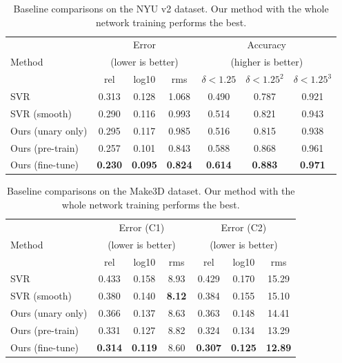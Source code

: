 \begin{table}
\center
\resizebox{1\linewidth}{!} {
\begin{tabular}{ | l |  c  c  c | c  c  c |}
\hline 
\multirow{3}{*}{{{Method}}} &\multicolumn{3}{c|}{Error} &\multicolumn{3}{c|}{Accuracy} \\
&\multicolumn{3}{c|}{(lower is better)} &\multicolumn{3}{c|}{(higher is better)} \\
\cline{2-7}
&rel &log10 &rms &$\delta < 1.25$ &$\delta < 1.25^2$ &$\delta < 1.25^3$  \\
\hline
%
SVR  &0.313	&0.128	&1.068	&0.490	&0.787	&0.921 \\
SVR (smooth) &0.290	 &0.116	&0.993	&0.514	&0.821	&0.943\\
Ours (unary only)  &0.295 	 &0.117 	 &0.985   &0.516 	 &0.815 	 &0.938  \\ 
%
Ours (pre-train) &0.257	 &0.101	  &0.843  	&0.588   	&0.868	&0.961  \\
Ours (fine-tune)  &\textbf{0.230} 	 &\textbf{0.095} 	 &\textbf{0.824}  &\textbf{0.614} 	 &\textbf{0.883} 	 &\textbf{0.971}\\    
\hline
\end{tabular}
}
\caption{Baseline comparisons on the NYU v2 dataset. 
Our method with the whole network training performs the best.
} \label{tab:anal_nyud2}
\end{table}










\begin{table}
\center
\resizebox{0.90\linewidth}{!} {
\begin{tabular}{ | l |  c  c  c | c  c  c |}
\hline 
\multirow{3}{*}{{{Method}}} &\multicolumn{3}{c|}{Error (C1)} &\multicolumn{3}{c|}{Error (C2)} \\
&\multicolumn{3}{c|}{(lower is better)} &\multicolumn{3}{c|}{(lower is better)} \\
\cline{2-7}
&rel &log10 &rms  &rel &log10 &rms  \\
\hline
%
SVR  &0.433	&0.158	&8.93  &0.429	&0.170	&15.29  \\
SVR (smooth) &0.380	&0.140	&\textbf{8.12}  &0.384	&0.155	&15.10 \\
Ours (unary only) &0.366 	 &0.137 	 &8.63  &0.363 	 &0.148 	 &14.41 \\
%
Ours (pre-train) &0.331	 &0.127	 &8.82  &0.324	&0.134	&13.29 \\
Ours (fine-tune)   &\textbf{0.314} &\textbf{0.119} &8.60 &\textbf{0.307} &\textbf{0.125} &\textbf{12.89} \\ 
%
\hline
\end{tabular}
}
\caption{Baseline comparisons on the Make3D dataset. 
Our method with the whole network training performs the best.
} \label{tab:anal_make3d}
\end{table}











